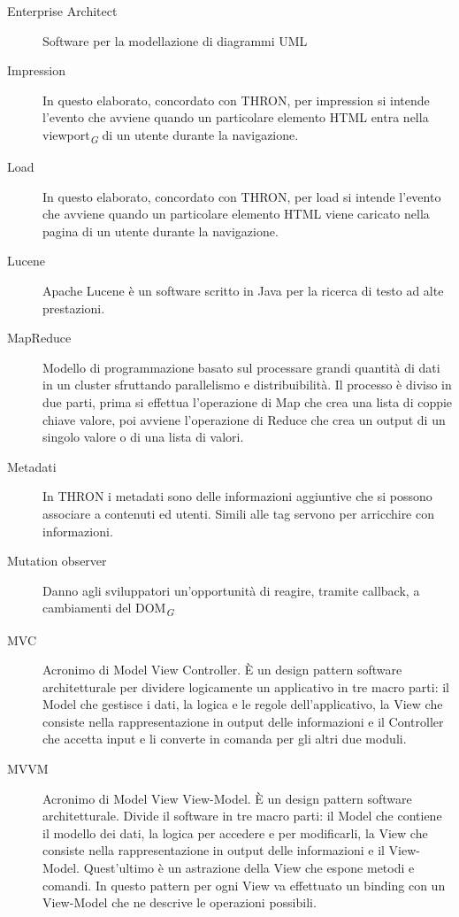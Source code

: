 \documentclass[a4paper, 12pt, twoside, openright]{book}
\newcommand{\gloss}[1]{#1\textsubscript{\textit{\tiny{G}}}}
\begin{document}
\begin {description}
\item[Enterprise Architect]
Software per la modellazione di diagrammi UML

\item[Impression]
In questo elaborato, concordato con THRON, per impression si intende l'evento che avviene quando un particolare elemento HTML entra nella \gloss{viewport} di un utente durante la navigazione.

\item[Load]
In questo elaborato, concordato con THRON, per load si intende l'evento che avviene quando un particolare elemento HTML viene caricato nella pagina di un utente durante la navigazione.
\item[Lucene]
Apache Lucene è un software scritto in Java per la ricerca di testo ad alte prestazioni.

\item[MapReduce]
Modello di programmazione basato sul processare grandi quantità di dati in un cluster sfruttando parallelismo e distribuibilità. Il processo è diviso in due parti, prima si effettua l'operazione di Map che crea una lista di coppie chiave valore, poi avviene l'operazione di Reduce che crea un output di un singolo valore o di una lista di valori.
\item[Metadati]
In THRON i metadati sono delle informazioni aggiuntive che si possono associare a contenuti ed utenti. Simili alle tag servono per arricchire con informazioni.
\item[Mutation observer]
Danno agli sviluppatori un'opportunità di reagire, tramite callback, a cambiamenti del \gloss{DOM}
\item[MVC]
Acronimo di Model View Controller. \`{E} un design pattern software architetturale per dividere logicamente un applicativo in tre macro parti: il Model che gestisce i dati, la logica e le regole dell'applicativo, la View che consiste nella rappresentazione in output delle informazioni e il Controller che accetta input e li converte in comanda per gli altri due moduli.
\item[MVVM]
Acronimo di Model View View-Model. \`{E} un design pattern software architetturale. Divide il software in tre macro parti: il Model che contiene il modello dei dati, la logica per accedere e per modificarli, la View che consiste nella rappresentazione in output delle informazioni e il View-Model. Quest'ultimo è un astrazione della View che espone metodi e comandi. In questo pattern per ogni View va effettuato un binding con un View-Model che ne descrive le operazioni possibili.


\end{description}
\end{document}
